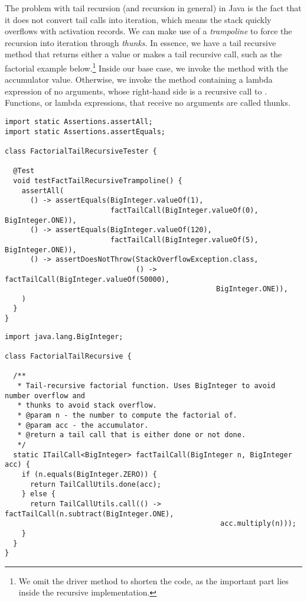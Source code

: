 The problem with tail recursion (and recursion in general) in Java is the fact that it does not convert tail calls into iteration, which means the stack quickly overflows with activation records. We can make use of a \emph{trampoline} to force the recursion into iteration through \emph{thunks}. In essence, we have a tail recursive method that returns either a value or makes a tail recursive call, such as the factorial example below.\footnote{We omit the driver method to shorten the code, as the important part lies inside the recursive implementation.} Inside our base case, we invoke the  method with the accumulator value. Otherwise, we invoke the  method containing a lambda expression of no arguments, whose right-hand side is a recursive call to . Functions, or lambda expressions, that receive no arguments are called thunks.

\begin{cl}{}
\begin{lstlisting}[language=MyJava]
import static Assertions.assertAll;
import static Assertions.assertEquals;

class FactorialTailRecursiveTester {
  
  @Test 
  void testFactTailRecursiveTrampoline() {
    assertAll(
      () -> assertEquals(BigInteger.valueOf(1), 
                         factTailCall(BigInteger.valueOf(0), BigInteger.ONE)),
      () -> assertEquals(BigInteger.valueOf(120), 
                         factTailCall(BigInteger.valueOf(5), BigInteger.ONE)),
      () -> assertDoesNotThrow(StackOverflowException.class,
                               () -> factTailCall(BigInteger.valueOf(50000), 
                                                  BigInteger.ONE)),
    )
  }
}
\end{lstlisting}
\end{cl}

\begin{cl}{}
\begin{lstlisting}[language=MyJava]
import java.lang.BigInteger;

class FactorialTailRecursive {
 
  /**
   * Tail-recursive factorial function. Uses BigInteger to avoid number overflow and
   * thunks to avoid stack overflow.
   * @param n - the number to compute the factorial of.
   * @param acc - the accumulator.
   * @return a tail call that is either done or not done.
   */
  static ITailCall<BigInteger> factTailCall(BigInteger n, BigInteger acc) {
    if (n.equals(BigInteger.ZERO)) {
      return TailCallUtils.done(acc);
    } else {
      return TailCallUtils.call(() -> factTailCall(n.subtract(BigInteger.ONE), 
                                                   acc.multiply(n)));
    }
  }
}
\end{lstlisting}
\end{cl}

